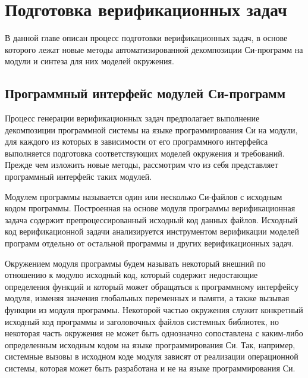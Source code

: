 \chapter{Подготовка верификационных задач}

В данной главе описан процесс подготовки верификационных задач, в основе которого лежат новые методы автоматизированной декомпозиции Си-программ на модули и синтеза для них моделей окружения.

\section{Программный интерфейс модулей Си-программ}
Процесс генерации верификационных задач предполагает выполнение декомпозиции программной системы на языке программирования Си на модули, для каждого из которых в зависимости от его программного интерфейса выполняется подготовка соответствующих моделей окружения и требований.
Прежде чем изложить новые методы, рассмотрим что из себя представляет программный интерфейс таких модулей.

Модулем программы называется один или несколько Си-файлов с исходным кодом программы.
Построенная на основе модуля программы верификационная задача содержит препроцессированный исходный код данных файлов.
Исходный код верификационной задачи анализируется инструментом верификации моделей программ  отдельно от остальной программы и других верификационных задач.

Окружением модуля программы будем называть некоторый внешний по отношению к модулю исходный код, который содержит недостающие определения функций и который может обращаться к программному интерфейсу модуля, изменяя значения глобальных переменных и памяти, а также вызывая функции из модуля программы.
Некоторой частью окружения служит конкретный исходный код программы и заголовочных файлов системных библиотек, но некоторая часть окружения не может быть однозначно сопоставлена с каким-либо определенным исходным кодом на языке программирования Си.
Так, например, системные вызовы в исходном коде модуля зависят от реализации операционной системы, которая может быть разработана и не на языке программирования Си.

